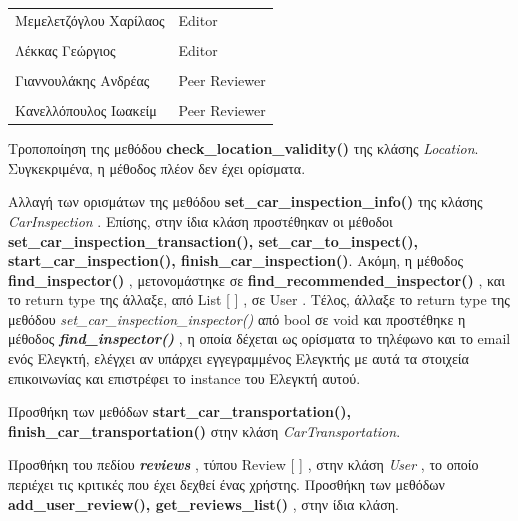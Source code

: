 \documentclass{../ol-softwaremanual}
\begin{document}
	
	\vspace{20pt}
	
	\begin{table}[htbp!]
		\begin{tabular}{ll}
			Μεμελετζόγλου Χαρίλαος & \en Editor \\
			\\ Λέκκας Γεώργιος      &   \en  Editor \\
			\\ Γιαννουλάκης Ανδρέας & \en Peer Reviewer \\
			\\ Κανελλόπουλος Ιωακείμ & \en Peer Reviewer \\ 
		\end{tabular}
	\end{table}

	\flushleft
	
	Τροποποίηση της μεθόδου \en\textbf{check\_location\_validity()} \gr της κλάσης \en \textit{Location}\gr. Συγκεκριμένα, η μέθοδος πλέον δεν έχει ορίσματα. \break
	
	Αλλαγή των ορισμάτων της μεθόδου \en\textbf{set\_car\_inspection\_info()} \gr της κλάσης \en \textit{CarInspection} \gr. Επίσης, στην ίδια κλάση προστέθηκαν οι μέθοδοι \en\textbf{set\_car\_inspection\_transaction(), set\_car\_to\_inspect(), start\_car\_inspection(), finish\_car\_inspection()}\gr. Ακόμη, η μέθοδος \en \textbf{find\_inspector()} \gr, μετονομάστηκε σε \en \textbf{find\_recommended\_inspector()} \gr, και το \en return type \gr της άλλαξε, από \en List [ ] \gr, σε \en User \gr. Τέλος, άλλαξε το \en return type \gr της μεθόδου \en\textit{set\_car\_inspection\_inspector()} \gr από \en bool \gr σε \en void \gr και προστέθηκε η μέθοδος \en \textbf{\textit{find\_inspector()}} \gr, η οποία δέχεται ως ορίσματα το τηλέφωνο και το \en email \gr ενός Ελεγκτή, ελέγχει αν υπάρχει εγγεγραμμένος Ελεγκτής με αυτά τα στοιχεία επικοινωνίας και επιστρέφει το \en instance \gr του Ελεγκτή αυτού. \break
	
	Προσθήκη των μεθόδων \en\textbf{start\_car\_transportation(), finish\_car\_transportation()} \gr στην κλάση \en \textit{CarTransportation}\gr. \break
	
	Προσθήκη του πεδίου \en \textbf{\textit{reviews}} \gr, τύπου \en Review [ ] \gr, στην κλάση \en \textit{User} \gr, το οποίο περιέχει τις κριτικές που έχει δεχθεί ένας χρήστης. Προσθήκη των μεθόδων \en\textbf{add\_user\_review(), get\_reviews\_list()} \gr, στην ίδια κλάση. \break
	
\end{document}
